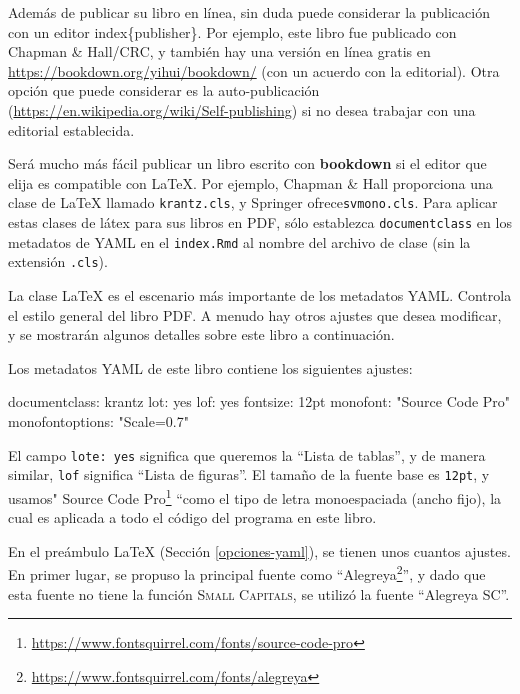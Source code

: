 \documentclass[12pt,]{krantz}
\makeatletter
\newenvironment{Shaded}{\begin{snugshade}}{\end{snugshade}}
\newcommand{\StringTok}[1]{\textcolor[rgb]{0.31,0.60,0.02}{{#1}}}
\newcommand{\FunctionTok}[1]{\textcolor[rgb]{0.00,0.00,0.00}{{#1}}}
\newcommand{\NormalTok}[1]{{#1}}
\renewcommand{\href}[2]{#2\footnote{\url{#1}}}
\newenvironment{kframe}{%
\medskip{}
\setlength{\fboxsep}{.8em}
 \def\at@end@of@kframe{}%
 \ifinner\ifhmode%
  \def\at@end@of@kframe{\end{minipage}}%
  \begin{minipage}{\columnwidth}%
 \fi\fi%
 \def\FrameCommand##1{\hskip\@totalleftmargin \hskip-\fboxsep
 \colorbox{shadecolor}{##1}\hskip-\fboxsep
     \hskip-\linewidth \hskip-\@totalleftmargin \hskip\columnwidth}%
 \MakeFramed {\advance\hsize-\width
   \@totalleftmargin\z@ \linewidth\hsize
   \@setminipage}}%
 {\par\unskip\endMakeFramed%
 \at@end@of@kframe}
\renewenvironment{Shaded}{\begin{kframe}}{\end{kframe}}
\theoremstyle{definition}
\theoremstyle{definition}
\theoremstyle{remark}
\makeatother
\begin{document}
Además de publicar su libro en línea, sin duda puede considerar la
publicación con un editor index\{publisher\}. Por ejemplo, este libro
fue publicado con Chapman \& Hall/CRC, y también hay una versión en
línea gratis en \url{https://bookdown.org/yihui/bookdown/} (con un
acuerdo con la editorial). Otra opción que puede considerar es la
auto-publicación (\url{https://en.wikipedia.org/wiki/Self-publishing})
si no desea trabajar con una editorial establecida.

Será mucho más fácil publicar un libro escrito con \textbf{bookdown} si
el editor que elija es compatible con LaTeX.  Por ejemplo,
Chapman \& Hall proporciona una clase de LaTeX llamado
\texttt{krantz.cls}, y Springer ofrece\texttt{svmono.cls}. Para aplicar
estas clases de látex para sus libros en PDF, sólo establezca
\texttt{documentclass} en los metadatos de YAML en el \texttt{index.Rmd}
al nombre del archivo de clase (sin la extensión \texttt{.cls}).

La clase LaTeX es el escenario más importante de los metadatos YAML.
Controla el estilo general del libro PDF. A menudo hay otros ajustes que
desea modificar, y se mostrarán algunos detalles sobre este libro a
continuación.

Los metadatos YAML de este libro contiene los siguientes ajustes:

\begin{Shaded}
\begin{Highlighting}[]
\FunctionTok{documentclass:} \NormalTok{krantz}
\FunctionTok{lot:} \NormalTok{yes}
\FunctionTok{lof:} \NormalTok{yes}
\FunctionTok{fontsize:} \NormalTok{12pt}
\FunctionTok{monofont:} \StringTok{"Source Code Pro"}
\FunctionTok{monofontoptions:} \StringTok{"Scale=0.7"}
\end{Highlighting}
\end{Shaded}

El campo \texttt{lote:\ yes} significa que queremos la ``Lista de
tablas'', y de manera similar, \texttt{lof} significa ``Lista de
figuras''. El tamaño de la fuente base es \texttt{12pt}, y usamos"
\href{https://www.fontsquirrel.com/fonts/source-code-pro}{Source Code
Pro} ``como el tipo de letra monoespaciada (ancho fijo), la cual es
aplicada a todo el código del programa en este libro.

En el preámbulo LaTeX (Sección \ref{opciones-yaml}), se tienen unos
cuantos ajustes. En primer lugar, se propuso la principal fuente
 como
``\href{https://www.fontsquirrel.com/fonts/alegreya}{Alegreya}'', y dado
que esta fuente no tiene la función \textsc{Small Capitals}, se utilizó
la fuente ``Alegreya SC''.
\end{document}
